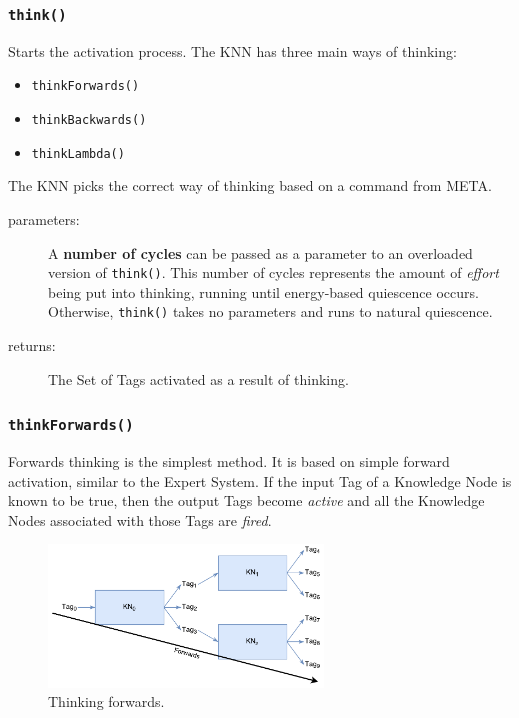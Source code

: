 \documentclass{beamer}
\newcommand{\code}[1]{\texttt{#1}}
\begin{document}
	\begin{frame}
		\frametitle{\code{think()}}
		Starts the activation process. The KNN has three main ways of thinking:
		\begin{itemize}
			\item \code{thinkForwards()}
			\item \code{thinkBackwards()}
			\item \code{thinkLambda()}
		\end{itemize}
		The KNN picks the correct way of thinking based on a command from META.
		\begin{description}
			\item[parameters:] A \textbf{number of cycles} can be passed as a parameter to an overloaded version of \code{think()}. This number of cycles represents the amount of \emph{effort} being put into thinking, running until energy-based quiescence  occurs. Otherwise, \code{think()} takes no parameters and runs to natural quiescence.
			\item[returns:] The Set of Tags activated as a result of thinking.
		\end{description}
	\end{frame}

	\begin{frame}
		\frametitle{\code{thinkForwards()}}
		Forwards thinking is the simplest method. It is based on simple forward activation, similar to the Expert System. If the input Tag of a Knowledge Node is known to be true, then the output Tags become \emph{active} and all the Knowledge Nodes associated with those Tags are \emph{fired}.
		\begin{figure}
			\centering
			\includegraphics[width=0.65\textwidth]{figures/forwards_thinking.pdf}
			\caption
			{Thinking forwards.}
			\label{fig:forwards_thinking}
		\end{figure}
	\end{frame}
\end{document}

